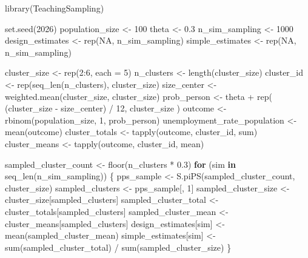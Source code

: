 \documentclass[
  spanish,
  11pt,
  letterpaper,
  oneside,
  open=any]{scrbook}
\newenvironment{Shaded}{\begin{snugshade}}{\end{snugshade}}
\newcommand{\AttributeTok}[1]{\textcolor[rgb]{0.40,0.45,0.13}{#1}}
\newcommand{\ConstantTok}[1]{\textcolor[rgb]{0.56,0.35,0.01}{#1}}
\newcommand{\ControlFlowTok}[1]{\textcolor[rgb]{0.00,0.23,0.31}{\textbf{#1}}}
\newcommand{\DecValTok}[1]{\textcolor[rgb]{0.68,0.00,0.00}{#1}}
\newcommand{\FloatTok}[1]{\textcolor[rgb]{0.68,0.00,0.00}{#1}}
\newcommand{\FunctionTok}[1]{\textcolor[rgb]{0.28,0.35,0.67}{#1}}
\newcommand{\NormalTok}[1]{\textcolor[rgb]{0.00,0.23,0.31}{#1}}
\newcommand{\OtherTok}[1]{\textcolor[rgb]{0.00,0.23,0.31}{#1}}
\newcommand{\SpecialCharTok}[1]{\textcolor[rgb]{0.37,0.37,0.37}{#1}}
\begin{document}
\begin{Shaded}
\begin{Highlighting}[]
\FunctionTok{library}\NormalTok{(TeachingSampling)}

\FunctionTok{set.seed}\NormalTok{(}\DecValTok{2026}\NormalTok{)}
\NormalTok{population\_size }\OtherTok{\textless{}{-}} \DecValTok{100}
\NormalTok{theta }\OtherTok{\textless{}{-}} \FloatTok{0.3}
\NormalTok{n\_sim\_sampling }\OtherTok{\textless{}{-}} \DecValTok{1000}
\NormalTok{design\_estimates }\OtherTok{\textless{}{-}} \FunctionTok{rep}\NormalTok{(}\ConstantTok{NA}\NormalTok{, n\_sim\_sampling)}
\NormalTok{simple\_estimates }\OtherTok{\textless{}{-}} \FunctionTok{rep}\NormalTok{(}\ConstantTok{NA}\NormalTok{, n\_sim\_sampling)}

\NormalTok{cluster\_size }\OtherTok{\textless{}{-}} \FunctionTok{rep}\NormalTok{(}\DecValTok{2}\SpecialCharTok{:}\DecValTok{6}\NormalTok{, }\AttributeTok{each =} \DecValTok{5}\NormalTok{)}
\NormalTok{n\_clusters }\OtherTok{\textless{}{-}} \FunctionTok{length}\NormalTok{(cluster\_size)}
\NormalTok{cluster\_id }\OtherTok{\textless{}{-}} \FunctionTok{rep}\NormalTok{(}\FunctionTok{seq\_len}\NormalTok{(n\_clusters), cluster\_size)}
\NormalTok{size\_center }\OtherTok{\textless{}{-}} \FunctionTok{weighted.mean}\NormalTok{(cluster\_size, cluster\_size)}
\NormalTok{prob\_person }\OtherTok{\textless{}{-}}\NormalTok{ theta }\SpecialCharTok{+} \FunctionTok{rep}\NormalTok{(}
\NormalTok{  (cluster\_size }\SpecialCharTok{{-}}\NormalTok{ size\_center) }\SpecialCharTok{/} \DecValTok{12}\NormalTok{,}
\NormalTok{  cluster\_size}
\NormalTok{)}
\NormalTok{outcome }\OtherTok{\textless{}{-}} \FunctionTok{rbinom}\NormalTok{(population\_size, }\DecValTok{1}\NormalTok{, prob\_person)}
\NormalTok{unemployment\_rate\_population }\OtherTok{\textless{}{-}} \FunctionTok{mean}\NormalTok{(outcome)}
\NormalTok{cluster\_totals }\OtherTok{\textless{}{-}} \FunctionTok{tapply}\NormalTok{(outcome, cluster\_id, sum)}
\NormalTok{cluster\_means }\OtherTok{\textless{}{-}} \FunctionTok{tapply}\NormalTok{(outcome, cluster\_id, mean)}

\NormalTok{sampled\_cluster\_count }\OtherTok{\textless{}{-}} \FunctionTok{floor}\NormalTok{(n\_clusters }\SpecialCharTok{*} \FloatTok{0.3}\NormalTok{)}
\ControlFlowTok{for}\NormalTok{ (sim }\ControlFlowTok{in} \FunctionTok{seq\_len}\NormalTok{(n\_sim\_sampling)) \{}
\NormalTok{  pps\_sample }\OtherTok{\textless{}{-}} \FunctionTok{S.piPS}\NormalTok{(sampled\_cluster\_count, cluster\_size)}
\NormalTok{  sampled\_clusters }\OtherTok{\textless{}{-}}\NormalTok{ pps\_sample[, }\DecValTok{1}\NormalTok{]}
\NormalTok{  sampled\_cluster\_size }\OtherTok{\textless{}{-}}\NormalTok{ cluster\_size[sampled\_clusters]}
\NormalTok{  sampled\_cluster\_total }\OtherTok{\textless{}{-}}\NormalTok{ cluster\_totals[sampled\_clusters]}
\NormalTok{  sampled\_cluster\_mean }\OtherTok{\textless{}{-}}\NormalTok{ cluster\_means[sampled\_clusters]}
\NormalTok{  design\_estimates[sim] }\OtherTok{\textless{}{-}} \FunctionTok{mean}\NormalTok{(sampled\_cluster\_mean)}
\NormalTok{  simple\_estimates[sim] }\OtherTok{\textless{}{-}}
    \FunctionTok{sum}\NormalTok{(sampled\_cluster\_total) }\SpecialCharTok{/} \FunctionTok{sum}\NormalTok{(sampled\_cluster\_size)}
\NormalTok{\}}


\end{Highlighting}
\end{Shaded}
\end{document}
